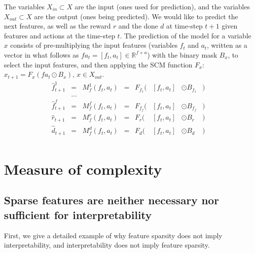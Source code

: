 \documentclass[a4paper,11pt,oneside]{report}
\begin{document}
The variables $X_{in}\subset X$ are the input (ones used for prediction), and the variables $X_{out}\subset X$ are the output (ones being predicted).
We would like to predict the next features, as well as the reward $r$ and the done $d$ at time-step $t+1$ given features and actions at the time-step $t$. The prediction of the model for a variable $x$ consists of pre-multiplying the input features (variables $f_t$ and $a_t$, written as a vector in what follows as $fa_t=[f_t,a_t]\in\mathbb R^{f+a}$) with the binary mask $B_x$, to select the input features, and then applying the SCM function $F_x$: $x_{t+1}=F_x(fa_t\odot B_x)$, $x\in X_{out}$.
$$
\begin{array}{lcllrllr}
\hat{f}_{t+1}^1&=&M_f^1(f_t,a_t)&=&F_{f_1}(&[f_t,a_t]&\odot B_{f_1}&)\\
&...&\\
\hat{f}_{t+1}^f&=&M_f^f(f_t,a_t)&=&F_{f_f}(&[f_t,a_t]&\odot B_{f_f}&)\\
\hat{r}_{t+1}&=&M_f^r(f_t,a_t)&=&F_{r}(&[f_t,a_t]&\odot B_{r}&)\\
\hat{d}_{t+1}&=&M_f^d(f_t,a_t)&=&F_{d}(&[f_t,a_t]&\odot B_{d}&)\\
\end{array}
$$

\section{Measure of complexity}

\subsection{Sparse features are neither necessary nor sufficient for interpretability}
First, we give a detailed example of why feature sparsity does not imply interpretability, and interpretability does not imply feature sparsity.
\end{document}
